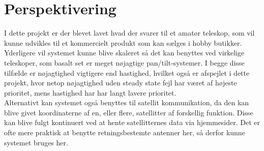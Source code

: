 \section{Perspektivering}

I dette projekt er der blevet lavet hvad der svarer til et amatør teleskop, som vil kunne udvikles til et kommercielt produkt som kan sælges i hobby butikker. Yderligere vil systemet kunne blive skaleret så det kan benyttes ved virkelige teleskoper, som basalt set er meget nøjagtige pan/tilt-systemer. I begge disse tilfælde er nøjagtighed vigtigere end hastighed, hvilket også er afspejlet i dette projekt, hvor netop nøjagtighed uden steady state fejl har været af højeste prioritet, mens hastighed har har langt lavere prioritet.
\\
Alternativt kan systemet også benyttes til satellit kommunikation, da den kan blive givet koordinaterne af en, eller flere, satellitter af forskellig funktion. Disse kan blive fulgt kontinuert ved at hente satellitternes data via hjemmesider. Det er ofte mere praktisk at benytte retningsbestemte antenner her, så derfor kunne systemet bruges her.